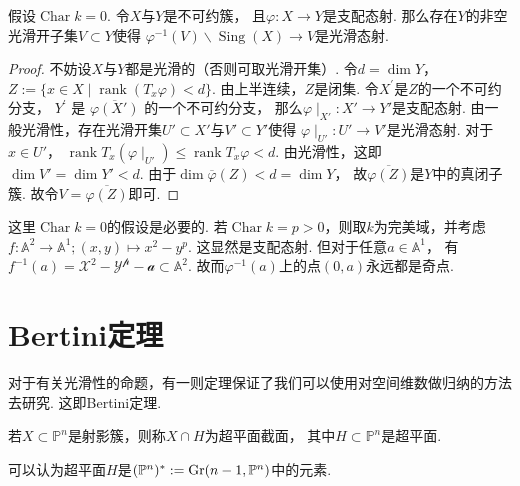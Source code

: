     \begin{theorem}[另一版本的一般光滑性]
        假设$\operatorname{Char} k =0$. 令$X$与$Y$是不可约簇，
        且$\varphi\colon X \rightarrow Y$是支配态射. 
        那么存在$Y$的非空光滑开子集$V \subset Y$使得
        $\varphi^{-1}(V) \backslash \operatorname{Sing}(X) \rightarrow V$是光滑态射.
    \end{theorem}
    \begin{proof}
        不妨设$X$与$Y$都是光滑的（否则可取光滑开集）. 令$d=\dim Y$，
        $Z:=\{x \in X\mid \operatorname{rank}(T_{x}\varphi) < d\}$. 
        由上半连续，$Z$是闭集. 令$X^{\prime}$是$Z$的一个不可约分支，
        $Y^{\prime}$ 是 $\overline{\varphi(X')}$ 的一个不可约分支，
        那么$\varphi\mid_{X'}\colon X'\rightarrow Y'$是支配态射. 
        由一般光滑性，存在光滑开集$U' \subset X'$与$V' \subset Y'$使得
        $\varphi\mid_{U'}\colon U' \rightarrow V'$是光滑态射. 
        对于$x \in U'$，
        $\operatorname{rank}T_{x}(\varphi\mid_{U'}) \leq \operatorname{rank}T_{x}\varphi <d$.
        由光滑性，这即$\dim V' =\dim Y' <d$. 由于$\dim \overline{\varphi}(Z) < d =\dim Y$，
        故$\overline{\varphi(Z)}$是$Y$中的真闭子簇. 故令$V = \overline{\varphi(Z)}$即可.
    \end{proof}

    \begin{remark}
        这里$\operatorname{Char}k=0$的假设是必要的. 
        若$\operatorname{Char}k=p>0$，则取$k$为完美域，并考虑
        $f\colon\mathbb{A}^{2} \rightarrow \mathbb{A}^{1};(x,y) \mapsto x^{2}-y^{p}$. 
        这显然是支配态射. 但对于任意$a \in \mathbb{A}^{1}$，
        有$f^{-1}(a)=\mathcal{X^{2}-Y^{p}-a} \subset \mathbb{A}^{2}$.
        故而$\varphi^{-1}(a)$上的点$(0,a)$永远都是奇点.
    \end{remark}

\section{Bertini定理}
    对于有关光滑性的命题，有一则定理保证了我们可以使用对空间维数做归纳的方法去研究. 
    这即Bertini定理.
    \begin{definition}
        若$X \subset \mathbb{P}^{n}$是射影簇，则称$X \cap H$为超平面截面，
        其中$H \subset \mathbb{P}^{n}$是超平面.
    \end{definition}

    \begin{remark}
        可以认为超平面$H$是$(\mathbb{P}^{n})^{*}:={\rm Gr}(n-1,\mathbb{P}^{n})$中的元素.
    \end{remark}


